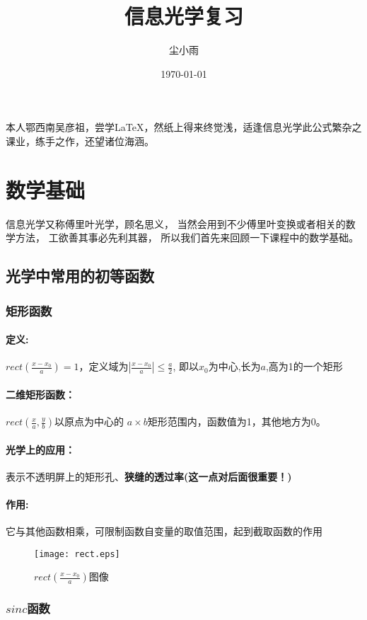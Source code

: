 \documentclass[UTF8]{ctexart}
\title{信息光学复习}%
\author{尘小雨}%
\date{\today}
\newcommand{\rect}[1]{rect( \f{x-x_{0}}{#1})}%
\newcommand{\rectt}[2]{rect( \f{x}{#1},\f{y}{#2})}%
\newcommand{\f}[2]{\frac{#1}{#2}}%
\begin{document}
本人鄂西南吴彦祖，尝学\LaTeX，然纸上得来终觉浅，适逢信息光学此公式繁杂之课业，练手之作，还望诸位海涵。
\tableofcontents   %
\section{数学基础}%
信息光学又称傅里叶光学，顾名思义，
当然会用到不少傅里叶变换或者相关的数学方法，
工欲善其事必先利其器，
所以我们首先来回顾一下课程中的数学基础。%
 \subsection{光学中常用的初等函数}%
  \subsubsection{矩形函数}%
    \paragraph{定义:}%
    $\rect{a}=1$，定义域为$\left\vert\f{x-x_{0}}{a}\right\vert\le\f{a}{2}$,%
即以$x_{0}$为中心,长为$a$,高为1的一个矩形
    \paragraph{二维矩形函数：}$\rectt{a}{b}$以原点为中心的
$a\times b$矩形范围内，函数值为1，其他地方为0。
    \paragraph{光学上的应用：}表示不透明屏上的矩形孔、\textbf{狭缝的透过率(这一点对后面很重要！)}%
    \paragraph{作用:}它与其他函数相乘，可限制函数自变量的取值范围，起到截取函数的作用
     \begin{figure}
      \centering
      \texttt{[image: rect.eps]}
      \caption{$\rect{a}$图像}
     \end{figure}%
     \subsubsection{$sinc$函数}%
\end{document}

